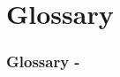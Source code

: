 \section*{Glossary}

\begin{frame}[t,allowframebreaks]
  \frametitle{Glossary -}
  \printglossaries
\end{frame}
